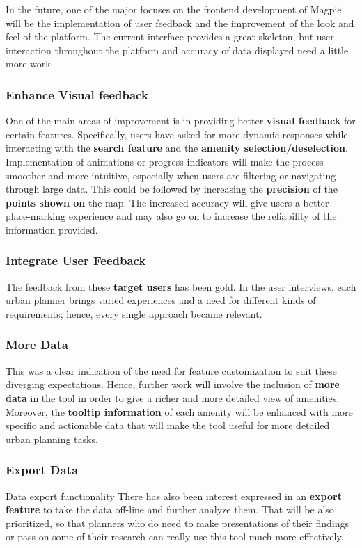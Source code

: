 In the future, one of the major focuses on the frontend development of Magpie will be the implementation of user feedback and the improvement of the look and feel of the platform. The current interface provides a great skeleton, but user interaction throughout the platform and accuracy of data displayed need a little more work.

\subsubsection{Enhance Visual feedback}

One of the main areas of improvement is in providing better \textbf{visual feedback} for certain features. Specifically, users have asked for more dynamic responses while interacting with the \textbf{search feature} and the \textbf{amenity selection/deselection}. Implementation of animations or progress indicators will make the process smoother and more intuitive, especially when users are filtering or navigating through large data. This could be followed by increasing the \textbf{precision} of the \textbf{points shown on} the map. The increased accuracy will give users a better place{-}marking experience and may also go on to increase the reliability of the information provided.

\subsubsection{Integrate User Feedback}

The feedback from these \textbf{target users} has been gold. In the user interviews, each urban planner brings varied experiences and a need for different kinds of requirements; hence, every single approach became relevant.

\subsubsection{More Data}

This was a clear indication of the need for feature customization to suit these diverging expectations. Hence, further work will involve the inclusion of \textbf{more data} in the tool in order to give a richer and more detailed view of amenities. Moreover, the \textbf{tooltip information} of each amenity will be enhanced with more specific and actionable data that will make the tool useful for more detailed urban planning tasks.

\subsubsection{Export Data}

Data export functionality There has also been interest expressed in an \textbf{export feature} to take the data off-line and further analyze them. That will be also prioritized, so that planners who do need to make presentations of their findings or pass on some of their research can really use this tool much more effectively.